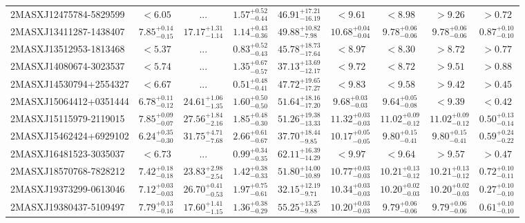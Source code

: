 \documentclass[onecolumn]{mn2e}
\begin{document}
{\begin{center}
\begin{longtable}{lcccccccc}
2MASXJ12475784-5829599 & $<6.05$ & ... & $1.57_{-0.44}^{+0.52}$ &$46.91_{-16.19}^{+17.21}$ & $<9.61$ & $<8.98$ & $>9.26$ & $>0.72$ \\
2MASXJ13411287-1438407 & $7.85_{-0.15}^{+0.14}$ & $17.17_{-1.14}^{+1.31}$ & $1.14_{-0.36}^{+0.43}$ &$49.88_{-7.98}^{+10.82}$ & $10.68_{-0.04}^{+0.04}$ & $9.78_{-0.06}^{+0.06}$ & $9.78_{-0.06}^{+0.06}$ & $0.87_{-0.10}^{+0.10}$ \\
2MASXJ13512953-1813468 & $<5.37$ & ... & $0.83_{-0.43}^{+0.52}$ &$45.78_{-17.64}^{+18.73}$ & $<8.97$ & $<8.30$ & $>8.72$ & $>0.77$ \\
2MASXJ14080674-3023537 & $<5.74$ & ... & $1.35_{-0.57}^{+0.67}$ &$37.13_{-12.17}^{+13.69}$ & $<9.72$ & $<8.72$ & $>9.51$ & $>0.88$ \\
2MASXJ14530794+2554327 & $<6.67$ & ... & $0.51_{-0.41}^{+0.48}$ &$47.72_{-17.27}^{+19.65}$ & $<9.83$ & $<9.58$ & $>9.42$ & $>0.45$ \\
2MASXJ15064412+0351444 & $6.78_{-0.12}^{+0.11}$ & $24.61_{-1.35}^{+1.06}$ & $1.60_{-0.50}^{+0.50}$ &$51.64_{-17.20}^{+18.16}$ & $9.68_{-0.03}^{+0.03}$ & $9.64_{-0.08}^{+0.05}$ & $<9.39$ & $<0.42$ \\
2MASXJ15115979-2119015 & $7.85_{-0.07}^{+0.09}$ & $27.56_{-2.16}^{+1.84}$ & $1.85_{-0.30}^{+0.48}$ &$51.26_{-13.33}^{+19.38}$ & $11.32_{-0.03}^{+0.03}$ & $11.02_{-0.12}^{+0.09}$ & $11.02_{-0.12}^{+0.09}$ & $0.50_{-0.14}^{+0.13}$ \\
2MASXJ15462424+6929102 & $6.24_{-0.30}^{+0.35}$ & $31.75_{-7.68}^{+4.71}$ & $2.66_{-0.67}^{+0.61}$ &$37.70_{-9.85}^{+18.44}$ & $10.17_{-0.05}^{+0.05}$ & $9.80_{-0.41}^{+0.15}$ & $9.80_{-0.41}^{+0.15}$ & $0.59_{-0.22}^{+0.24}$ \\
2MASXJ16481523-3035037 & $<6.73$ & ... & $0.99_{-0.35}^{+0.34}$ &$62.11_{-14.29}^{+16.39}$ & $<9.97$ & $<9.64$ & $>9.57$ & $>0.47$ \\
2MASXJ18570768-7828212 & $7.42_{-0.18}^{+0.18}$ & $23.83_{-2.54}^{+2.98}$ & $1.42_{-0.33}^{+0.38}$ &$51.80_{-10.89}^{+14.00}$ & $10.77_{-0.03}^{+0.03}$ & $10.21_{-0.12}^{+0.13}$ & $10.21_{-0.12}^{+0.13}$ & $0.72_{-0.11}^{+0.10}$ \\
2MASXJ19373299-0613046 & $7.12_{-0.03}^{+0.03}$ & $26.70_{-0.53}^{+0.41}$ & $1.97_{-0.61}^{+0.75}$ &$32.15_{-9.71}^{+12.19}$ & $10.34_{-0.03}^{+0.03}$ & $10.20_{-0.03}^{+0.02}$ & $10.20_{-0.03}^{+0.02}$ & $0.27_{-0.10}^{+0.10}$ \\
2MASXJ19380437-5109497 & $7.79_{-0.16}^{+0.13}$ & $17.60_{-1.15}^{+1.41}$ & $1.36_{-0.29}^{+0.38}$ &$55.25_{-9.88}^{+13.25}$ & $10.20_{-0.03}^{+0.03}$ & $9.79_{-0.06}^{+0.06}$ & $9.79_{-0.06}^{+0.06}$ & $0.61_{-0.10}^{+0.10}$ \\

\end{longtable}
\end{center}}
\end{document}
